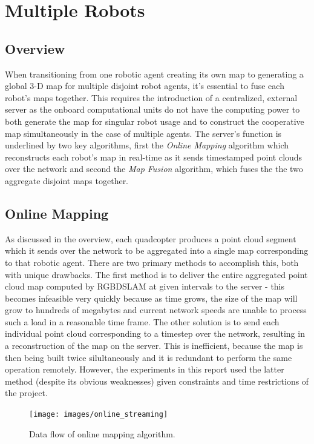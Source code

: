 \documentclass[letterpaper, oneside, 10pt]{report}
\begin{document}
\chapter{Multiple Robots}

\section{Overview}

When transitioning from one robotic agent creating its own map to generating a global 3-D map for multiple disjoint robot agents, it's essential to fuse each robot's maps together. This requires the introduction of a centralized, external server as the onboard computational units do not have the computing power to both generate the map for singular robot usage and to construct the cooperative map simultaneously in the case of multiple agents. The server's function is underlined by two key algorithms, first the \textsl{Online Mapping} algorithm which reconstructs each robot's map in real-time as it sends timestamped point clouds over the network and second the \textsl{Map Fusion} algorithm, which fuses the the two aggregate disjoint maps together.

\section{Online Mapping}
As discussed in the overview, each quadcopter produces a point cloud segment which it sends over the network to be aggregated into a single map corresponding to that robotic agent. There are two primary methods to accomplish this, both with unique drawbacks. The first method is to deliver the entire aggregated point cloud map computed by RGBDSLAM at given intervals to the server - this becomes infeasible very quickly because as time grows, the size of the map will grow to hundreds of megabytes and current network speeds are unable to process such a load in a reasonable time frame. The other solution is to send each individual point cloud corresponding to a timestep over the network, resulting in a reconstruction of the map on the server. This is inefficient, because the map is then being built twice silultaneously and it is redundant to perform the same operation remotely. However, the experiments in this report used the latter method (despite its obvious weaknesses) given constraints and time restrictions of the project.

\begin{figure}[h!]
 \caption{Data flow of online mapping algorithm.}
 \centering
   \texttt{[image: images/online\_streaming]}
 \label{fig: online stream.}
\end{figure}
\end{document}
